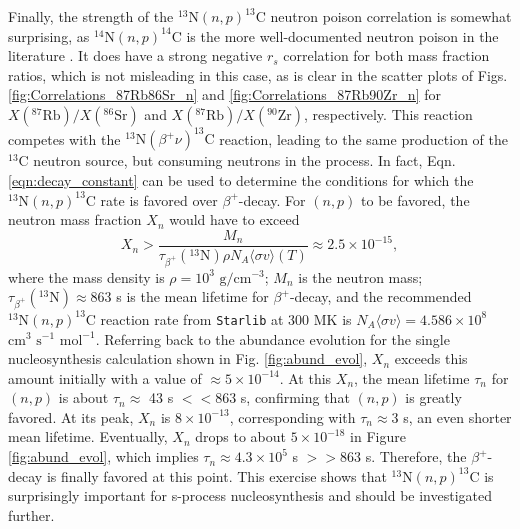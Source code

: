 Finally, the strength of the $^{13}\mathrm{N}(n,p)^{13}\mathrm{C}$ neutron poison correlation is somewhat surprising, as $^{14}\mathrm{N}(n,p)^{14}\mathrm{C}$ is the more well-documented neutron poison in the literature \cite{Habing2004}. It does have a strong negative $r_{s}$ correlation for both mass fraction ratios, which is not misleading in this case, as is clear in the scatter plots of Figs. \ref{fig:Correlations_87Rb86Sr_n} and \ref{fig:Correlations_87Rb90Zr_n} for $X(^{87}\mathrm{Rb})/X(^{86}\mathrm{Sr})$ and $X(^{87}\mathrm{Rb})/X(^{90}\mathrm{Zr})$, respectively. This reaction competes with the $^{13}\mathrm{N}(\beta^{+}\nu)^{13}\mathrm{C}$ reaction, leading to the same production of the $^{13}$C neutron source, but consuming neutrons in the process. In fact, Eqn. \ref{eqn:decay_constant} can be used to determine the conditions for which the $^{13}\mathrm{N}(n,p)^{13}\mathrm{C}$ rate is favored over $\beta^{+}$-decay. For $(n,p)$ to be favored, the neutron mass fraction $X_{n}$ would have to exceed
\begin{equation} \label{eqn:n_mass_frac_condition}
X_{n} > \frac{M_{n}}{\tau_{\beta^{+}}(^{13}\mathrm{N}) \rho N_{A} \langle \sigma v \rangle(T)} \approx 2.5 \times 10^{-15},
\end{equation}
where the mass density is $\rho = 10^{3}$ $\mathrm{g}/\mathrm{cm}^{-3}$; $M_{n}$ is the neutron mass; $\tau_{\beta^{+}}(^{13}\mathrm{N}) \approx 863$ s \cite{Audi2003} is the mean lifetime for $\beta^{+}$-decay, and the recommended $^{13}\mathrm{N}(n,p)^{13}\mathrm{C}$ reaction rate from \texttt{Starlib} at 300 MK is $N_{A} \langle \sigma v \rangle = 4.586 \times 10^{8}$ $\mathrm{cm}^{3}$ $\mathrm{s}^{-1}$ $\mathrm{mol}^{-1}$. Referring back to the abundance evolution for the single nucleosynthesis calculation shown in Fig. \ref{fig:abund_evol}, $X_{n}$ exceeds this amount initially with a value of $\approx 5 \times 10^{-14}$. At this $X_{n}$, the mean lifetime $\tau_{n}$ for $(n,p)$ is about $\tau_{n} \approx$ 43 s $<< 863$ s, confirming that $(n,p)$ is greatly favored. At its peak, $X_{n}$ is $8 \times 10^{-13}$, corresponding with $\tau_{n} \approx 3$ s, an even shorter mean lifetime. Eventually, $X_{n}$ drops to about $5 \times 10^{-18}$ in Figure \ref{fig:abund_evol}, which implies $\tau_{n} \approx 4.3 \times 10^{5}$ s $>> 863$ s. Therefore, the $\beta^{+}$-decay is finally favored at this point. This exercise shows that $^{13}\mathrm{N}(n,p)^{13}\mathrm{C}$ is surprisingly important for s-process nucleosynthesis and should be investigated further.

